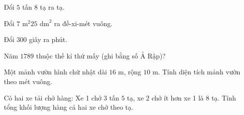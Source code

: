 \begin{ex} %
Đổi $5$ tấn $8$ tạ ra tạ.
\end{ex}

\begin{ex} %
Đổi $7\text{ m}^2 25\text{ dm}^2$ ra đề-xi-mét vuông.
\end{ex}

\begin{ex} %
Đổi $300$ giây ra phút.
\end{ex}

\begin{ex} %
Năm $1789$ thuộc thế kỉ thứ mấy (ghi bằng số Ả Rập)?
\end{ex}

\begin{ex} %
Một mảnh vườn hình chữ nhật dài $16\text{ m}$, rộng $10\text{ m}$. Tính diện tích mảnh vườn theo mét vuông.
\end{ex}

\begin{ex} %
Có hai xe tải chở hàng: Xe 1 chở $3$ tấn $5$ tạ, xe 2 chở ít hơn xe 1 là $8$ tạ. Tính tổng khối lượng hàng cả hai xe chở theo tạ.
\end{ex}
